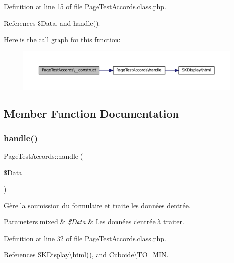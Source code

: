 Definition at line 15 of file Page\+Test\+Accords.\+class.\+php.



References \$\+Data, and handle().

Here is the call graph for this function\+:\nopagebreak
\begin{figure}[H]
\begin{center}
\leavevmode
\includegraphics[width=350pt]{class_page_test_accords_ad6555048fa59957079e5b3df9a6628e9_cgraph}
\end{center}
\end{figure}


\subsection{Member Function Documentation}
\mbox{\label{class_page_test_accords_a13df380846bd8e51f5f1bb405894d543}} 
\subsubsection{\texorpdfstring{handle()}{handle()}}
{\footnotesize\ttfamily Page\+Test\+Accords\+::handle (\begin{DoxyParamCaption}\item[{}]{\$\+Data }\end{DoxyParamCaption})\hspace{0.3cm}{\ttfamily [protected]}}

Gère la soumission du formulaire et traite les données d\textquotesingle{}entrée.


\begin{DoxyParams}[1]{Parameters}
mixed & {\em \$\+Data} & Les données d\textquotesingle{}entrée à traiter. \\
\hline
\end{DoxyParams}


Definition at line 32 of file Page\+Test\+Accords.\+class.\+php.



References S\+K\+Display\textbackslash{}html(), and Cuboide\textbackslash{}\+T\+O\+\_\+\+M\+IN.



